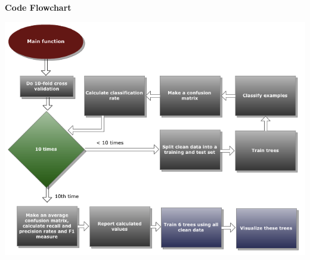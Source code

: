 \documentclass[12pt]{article}
\begin{document}
{\bf Code Flowchart} \\
\begin{center}
  \includegraphics{report-images/flowchart.png}
\end{center}
\end{document}
